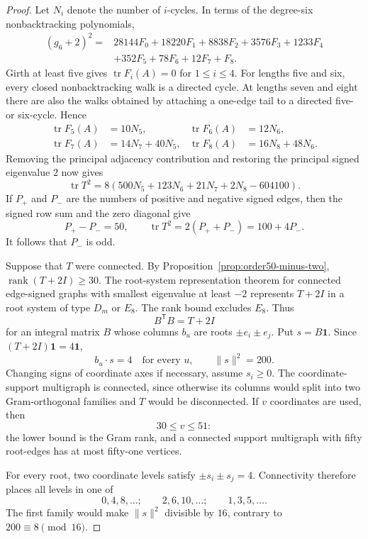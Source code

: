 \documentclass[a4paper,10pt,reqno]{amsart}
\theoremstyle{plain}
\theoremstyle{definition}
\theoremstyle{remark}
\newcommand{\one}{\mathbf 1}
\newcommand{\tr}{\operatorname{tr}}
\begin{document}
\begin{proof}
Let \(N_i\) denote the number of \(i\)-cycles.  In terms of the degree-six
nonbacktracking polynomials,
\[
\begin{aligned}
(g_6+2)^2={}&28144F_0+18220F_1+8838F_2+3576F_3+1233F_4\\
&+352F_5+78F_6+12F_7+F_8.
\end{aligned}
\]
Girth at least five gives \(\tr F_i(A)=0\) for \(1\le i\le4\).  For
lengths five and six, every closed nonbacktracking walk is a directed cycle.
At lengths seven and eight there are also the walks obtained by attaching a
one-edge tail to a directed five- or six-cycle.  Hence
\[
\begin{aligned}
\tr F_5(A)&=10N_5,&
\tr F_6(A)&=12N_6,\\
\tr F_7(A)&=14N_7+40N_5,&
\tr F_8(A)&=16N_8+48N_6.
\end{aligned}
\]
Removing the principal adjacency contribution and restoring the principal
signed eigenvalue \(2\) now gives
\[
\tr T^2
=8(500N_5+123N_6+21N_7+2N_8-604100).
\]
If \(P_+\) and \(P_-\) are the numbers of positive and negative signed edges,
then the signed row sum and the zero diagonal give
\[
P_+-P_-=50,\qquad
\tr T^2=2(P_++P_-)=100+4P_-.
\]
It follows that \(P_-\) is odd.

Suppose that \(T\) were connected.  By
Proposition~\ref{prop:order50-minus-two},
\(\operatorname{rank}(T+2I)\ge30\).  The root-system representation theorem for connected
edge-signed graphs with smallest eigenvalue at least \(-2\)
\cite[Theorem~2]{GreavesEtAl2015} represents \(T+2I\) in a root system of
type \(D_m\) or \(E_8\).  The rank bound excludes \(E_8\).  Thus
\[
B^{\mathsf T}B=T+2I
\]
for an integral matrix \(B\) whose columns \(b_u\) are roots
\(\pm e_i\pm e_j\).  Put \(s=B\one\).  Since
\((T+2I)\one=4\one\),
\[
b_u\mathbin{\cdot}s=4\quad\text{for every }u,
\qquad
\lVert s\rVert^2=200.
\]
Changing signs of coordinate axes if necessary, assume \(s_i\ge0\).
The coordinate-support multigraph is connected, since otherwise its columns
would split into two Gram-orthogonal families and \(T\) would be disconnected.
If \(v\) coordinates are used, then
\[
30\le v\le51:
\]
the lower bound is the Gram rank, and a connected support multigraph with
fifty root-edges has at most fifty-one vertices.

For every root, two coordinate levels satisfy
\(\pm s_i\pm s_j=4\).  Connectivity therefore places all levels in one of
\[
0,4,8,\ldots;\qquad
2,6,10,\ldots;\qquad
1,3,5,\ldots.
\]
The first family would make \(\lVert s\rVert^2\) divisible by \(16\), contrary
to \(200\equiv8\pmod {16}\).


\end{proof}
\end{document}

